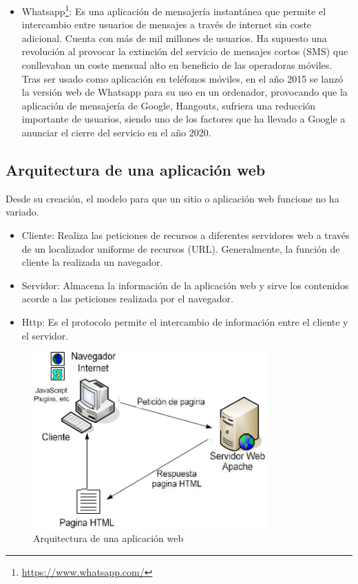\begin{itemize}
\item Whatsapp\footnote{\url{https://www.whatsapp.com/}}: Es una aplicación de mensajería instantánea que permite el intercambio entre usuarios de mensajes a través de internet sin coste adicional. Cuenta con más de mil millones de usuarios. Ha supuesto una revolución al provocar la extinción del servicio de mensajes cortos (SMS) que conllevaban un coste mensual alto en beneficio de las operadoras móviles. Tras ser usado como aplicación en teléfonos móviles, en el año 2015 se lanzó la versión web de Whatsapp para su uso en un ordenador, provocando que la aplicación de mensajería de Google, Hangouts, sufriera una reducción importante de usuarios, siendo uno de los factores que ha llevado a Google a anunciar el cierre del servicio en el año 2020.
\end{itemize}

\subsection{Arquitectura de una aplicación web}
Desde su creación, el modelo para que un sitio o aplicación web funcione no ha variado.
\begin{itemize}
	\item Cliente: Realiza las peticiones de recursos a diferentes servidores web a través de un localizador uniforme de recursos (URL). Generalmente, la función de cliente la realizada un navegador.
	\item Servidor: Almacena la información de la aplicación web y sirve los contenidos acorde a las peticiones realizada por el navegador.
	\item Http: Es el protocolo permite el intercambio de información entre el cliente y el servidor.
\end{itemize}
\begin{figure}[H]
  \begin{center}
    \includegraphics[width=0.8\textwidth]{figures/arquitecturaweb.jpg}
		\caption{Arquitectura de una aplicación web}
		\label{fig.arquitecturaweb}
		\end{center}
\end{figure}

